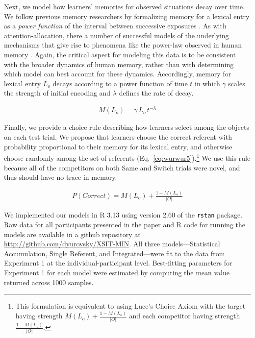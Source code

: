 \documentclass[authoryear,review]{elsarticle}
\begin{document}
Next, we model how learners' memories for observed situations decay over time. We follow previous memory researchers by formalizing memory for a lexical entry as a \emph{power function} of the interval between successive exposures \citep{Anderson1991a}. As with attention-allocation, there a number of successful models of the underlying mechanisms that give rise to phenomena like the power-law observed in human memory \citep[e.g.,][]{Murdock1982, Shiffrin1997}. Again, the critical aspect for modeling this data is to be consistent with the broader dynamics of human memory, rather than with determining which model can best account for these dynamics. Accordingly, memory for lexical entry $L_{o}$ decays according to a power function of time $t$ in which $\gamma$ scales the strength of initial encoding and $\lambda$ defines the rate of decay.

\begin{align}
M(L_{o}) = \gamma \, L_{o} \, t^{-\lambda} \label{eq:wurwur4}
\end{align}

Finally, we provide a choice rule describing how learners select among the objects on each test trial. We propose that learners choose the correct referent with probability proportional to their memory for its lexical entry, and otherwise choose randomly among the set of referents (Eq.~\ref{eq:wurwur5}).\footnote{This formulation is equivalent to using Luce's  \citeyearpar{Luce1959} Choice Axiom with the target having strength  $M(L_{o}) + \frac{1-M(L_{o})}{|O|}$ and each competitor having strength $\frac{1-M(L_{o})}{|O|}$.} We use this rule because all of the competitors on both Same and Switch trials were novel, and thus should have no trace in memory.

\begin{align}
P(Correct) = M(L_{o}) + \frac{1-M(L_{o})}{|O|} \label{eq:wurwur5}
\end{align}

We implemented our models in R 3.13 using version 2.60 of the \texttt{rstan} package. Raw data for all participants presented in the paper and R code for running the models are available in a github repository at \url{http://github.com/dyurovsky/XSIT-MIN}. All three models---Statistical Accumulation, Single Referent, and Integrated---were fit to the data from Experiment 1 at the individual-participant level. Best-fitting parameters for Experiment 1 for each model were estimated by computing the mean value returned across 1000 samples.
\end{document}
